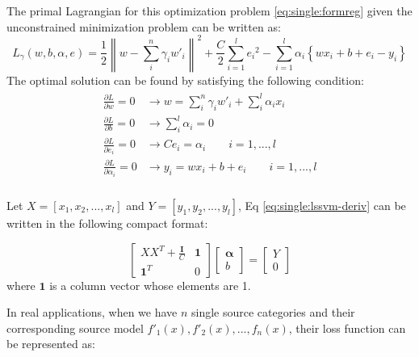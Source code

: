The primal Lagrangian for this optimization problem \ref{eq:single:formreg} given the unconstrained minimization problem can be written as: 
\begin{equation}
	{L_\gamma }\left( {w,b,\alpha ,e} \right) = \frac{1}{2}{\left\| {w - \sum\limits_{i}^{n}\gamma_i w'_i} \right\|^2} + \frac{C}{2}\sum\limits_{i = 1}^l {{e _i}^2}  - \sum\limits_{i = 1}^l {{\alpha _i}\left\{ {w{x_i} + b + {e_i} - {y_i}} \right\}} 
\end{equation}
The optimal solution can be found by satisfying the following condition:
\begin{eqnarray}\label{eq:single:lssvm-deriv}
\begin{aligned}
\frac{{\partial L}}{{\partial w}} = 0 &\to w = \sum\limits_{i}^{n}\gamma_i w'_i + \sum\limits_i^l {{\alpha _i}{x_i}} \\
\frac{{\partial L}}{{\partial b}} = 0 &\to \sum\limits_i^l {{\alpha _i} = 0} \\
\frac{{\partial L}}{{\partial e_i}} = 0 &\to C{e_i} = {\alpha _i} \qquad i = 1,...,l\\
\frac{{\partial L}}{{\partial {\alpha _i}}} = 0 &\to {y_i} = {w} {{x_i}} + b + {e _i}\qquad i = 1,...,l\\
\end{aligned}
\end{eqnarray}

Let $X=\left[x_1,x_2,...,x_l\right]$ and $Y=[y_1,y_2,...,y_l]$, Eq \eqref{eq:single:lssvm-deriv} can be written in the following compact format:

\begin{equation}\label{eq:single:matrixsolve}
	\left[\begin{array}{cc}
	XX^T+\frac{\mathbf{I}}{C}&\mathbf{1}\\
	\mathbf{1}^T&0
	\end{array}\right]\left[\begin{array}{c} \mathbf{\alpha}\\b
	\end{array}\right] = \left[\begin{array}{c} Y\\0
	\end{array}\right]
\end{equation} 
where $\mathbf{1}$ is a column  vector whose elements are 1. 

In real applications, when we have $n$ single source categories and their corresponding source model $f'_1(x),f'_2(x),...,f_n(x)$, their loss function can be represented as:

